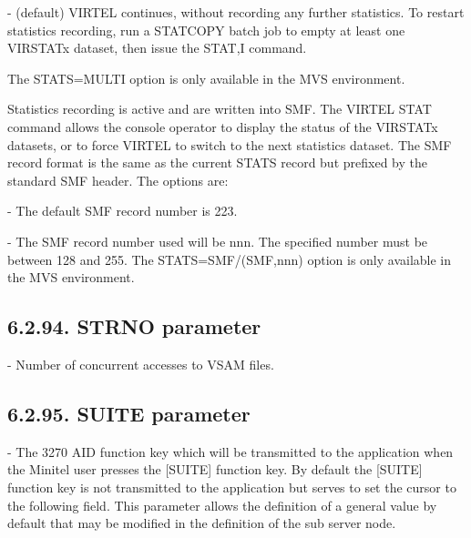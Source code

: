 \documentclass[letterpaper,10pt,english]{sphinxmanual}
\begin{document}
 - (default) VIRTEL continues, without recording any further statistics. To restart statistics recording, run a STATCOPY batch job to empty at least one VIRSTATx dataset, then issue the STAT,I command.

The STATS=MULTI option is only available in the MVS environment.

 Statistics recording is active and are written into SMF. The VIRTEL STAT command allows the console operator to display the status of the VIRSTATx datasets, or to force VIRTEL to switch to the next statistics dataset. The SMF record format is the same as the current STATS record but prefixed by the standard SMF header. The options are:

 - The default SMF record number is 223.

 - The SMF record number used will be nnn. The specified number must be between 128 and 255. The STATS=SMF/(SMF,nnn) option is only available in the MVS environment.


\subsection{6.2.94. STRNO parameter}
\label{\detokenize{Installation_Guide:strno-parameter}}
\begin{sphinxVerbatim}[commandchars=\\\{\}]
 
\end{sphinxVerbatim}

 - Number of concurrent accesses to VSAM files.


\subsection{6.2.95. SUITE parameter}
\label{\detokenize{Installation_Guide:suite-parameter}}
\begin{sphinxVerbatim}[commandchars=\\\{\}]
 
\end{sphinxVerbatim}

 - The 3270 AID function key which will be transmitted to the application when the Minitel user presses the {[}SUITE{]} function key. By default the {[}SUITE{]} function key is not transmitted to the application but serves to set the cursor to the following field. This parameter allows the definition of a general value by default that may be modified in the definition of the sub server node.
\end{document}

